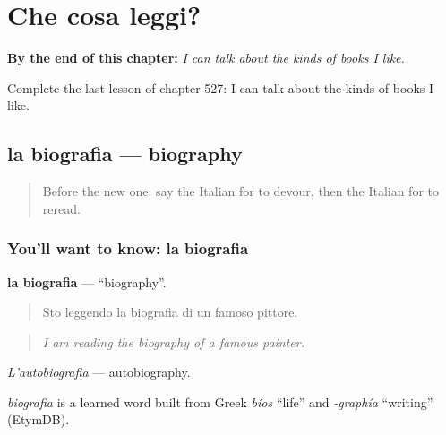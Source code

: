 
\chapter{Che cosa leggi?}
\label{ch:it-che-cosa-leggi}

\begin{chapteropening}
\textbf{By the end of this chapter:} \emph{I can talk about the kinds of books I like.}

Complete the last lesson of chapter 527: I can talk about the kinds of books I like.
\end{chapteropening}

\section[la biografia]{la biografia — biography}

\label{lesson:IT-C527-biografia}



\begin{quote}
Before the new one: say the Italian for to devour, then the Italian for to reread.
\end{quote}

\subsection*{You'll want to know: la biografia}
\textbf{la biografia} — \textquotedblleft{}biography\textquotedblright{}.

\begin{quote}
Sto leggendo la biografia di un famoso pittore.
\end{quote}

\begin{quote}
\emph{I am reading the biography of a famous painter.}
\end{quote}

\emph{L'autobiografia} — autobiography.

\begin{cousinweb}
\emph{biografia} is a learned word built from Greek \emph{bíos} \textquotedblleft{}life\textquotedblright{} and \emph{-graphía} \textquotedblleft{}writing\textquotedblright{} (EtymDB).
\end{cousinweb}

